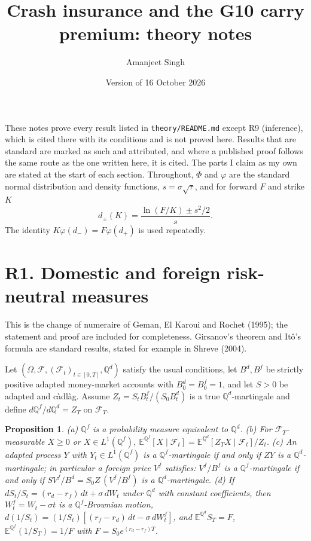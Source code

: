 \documentclass[11pt]{article}
\title{Crash insurance and the G10 carry premium: theory notes}
\author{Amanjeet Singh}
\date{Version of 16 October 2026}
\newtheorem{proposition}{Proposition}
\theoremstyle{remark}
\newcommand{\E}{\mathbb{E}}
\newcommand{\Q}{\mathbb{Q}}
\begin{document}
\maketitle

\noindent These notes prove every result listed in \texttt{theory/README.md} except R9 (inference), which is cited there with its conditions and is not proved here. Results that are standard are marked as such and attributed, and where a published proof follows the same route as the one written here, it is cited. The parts I claim as my own are stated at the start of each section. Throughout, $\Phi$ and $\varphi$ are the standard normal distribution and density functions, $s=\sigma\sqrt{\tau}$, and for forward $F$ and strike $K$
\[
d_\pm(K)=\frac{\ln(F/K)\pm s^2/2}{s}.
\]
The identity $K\varphi(d_-)=F\varphi(d_+)$ is used repeatedly.

\section*{R1. Domestic and foreign risk-neutral measures}

This is the change of numeraire of Geman, El Karoui and Rochet (1995); the statement and proof are included for completeness. Girsanov's theorem and It\^o's formula are standard results, stated for example in Shreve (2004).

Let $(\Omega,\mathcal F,(\mathcal F_t)_{t\in[0,T]},\Q^d)$ satisfy the usual conditions, let $B^d,B^f$ be strictly positive adapted money-market accounts with $B^d_0=B^f_0=1$, and let $S>0$ be adapted and c\`adl\`ag. Assume $Z_t=S_tB^f_t/(S_0B^d_t)$ is a true $\Q^d$-martingale and define $d\Q^f/d\Q^d=Z_T$ on $\mathcal F_T$.

\begin{proposition}
(a) $\Q^f$ is a probability measure equivalent to $\Q^d$. (b) For $\mathcal F_T$-measurable $X\ge0$ or $X\in L^1(\Q^f)$, $\E^{\Q^f}[X\mid\mathcal F_t]=\E^{\Q^d}[Z_TX\mid\mathcal F_t]/Z_t$. (c) An adapted process $Y$ with $Y_t\in L^1(\Q^f)$ is a $\Q^f$-martingale if and only if $ZY$ is a $\Q^d$-martingale; in particular a foreign price $V^f$ satisfies: $V^f/B^f$ is a $\Q^f$-martingale if and only if $SV^f/B^d=S_0Z\,(V^f/B^f)$ is a $\Q^d$-martingale. (d) If $dS_t/S_t=(r_d-r_f)\,dt+\sigma\,dW_t$ under $\Q^d$ with constant coefficients, then $W^f_t=W_t-\sigma t$ is a $\Q^f$-Brownian motion, $d(1/S_t)=(1/S_t)[(r_f-r_d)\,dt-\sigma\,dW^f_t]$, and $\E^{\Q^d}S_T=F$, $\E^{\Q^f}(1/S_T)=1/F$ with $F=S_0e^{(r_d-r_f)T}$.
\end{proposition}
\end{document}
